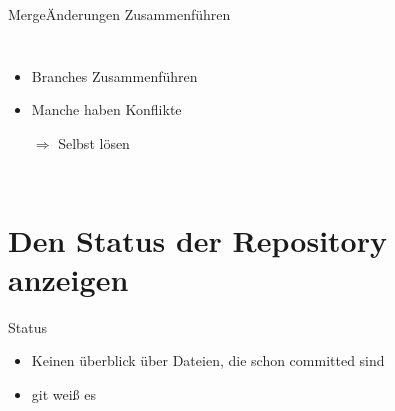\documentclass{beamer}
\begin{document}
    \begin{frame}{Merge}{Änderungen Zusammenführen}
      \begin{columns}
          \begin{itemize}[<+->]
            \item Branches Zusammenführen
            \item Manche haben Konflikte
            \item[$\Rightarrow$] Selbst lösen
          \end{itemize}
      \end{columns}
    \end{frame}

  \section[Status]{Den Status der Repository anzeigen}

    \begin{frame}{Status}
          \begin{itemize}[<+->]
            \item Keinen überblick über Dateien, die schon committed sind
            \item git weiß es
          \end{itemize}
    \end{frame}
\end{document}
